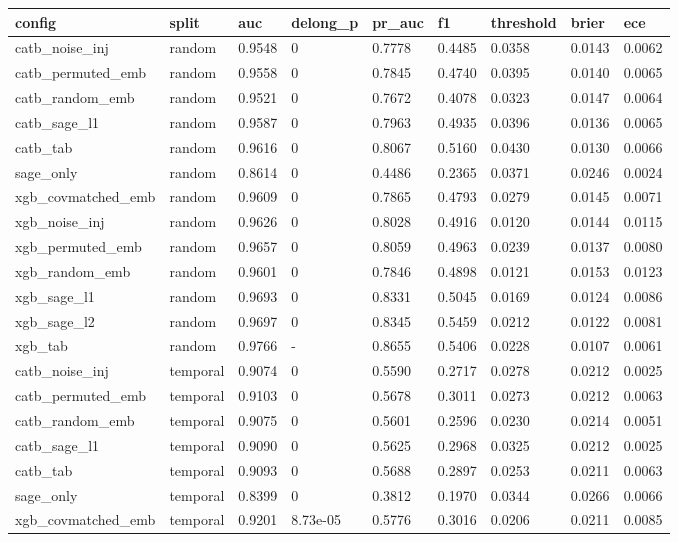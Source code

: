\begin{tabular}{lllllllll}
\toprule
config & split & auc & delong\_p & pr\_auc & f1 & threshold & brier & ece \\
\midrule
catb\_noise\_inj & random & 0.9548 & 0 & 0.7778 & 0.4485 & 0.0358 & 0.0143 & 0.0062 \\
catb\_permuted\_emb & random & 0.9558 & 0 & 0.7845 & 0.4740 & 0.0395 & 0.0140 & 0.0065 \\
catb\_random\_emb & random & 0.9521 & 0 & 0.7672 & 0.4078 & 0.0323 & 0.0147 & 0.0064 \\
catb\_sage\_l1 & random & 0.9587 & 0 & 0.7963 & 0.4935 & 0.0396 & 0.0136 & 0.0065 \\
catb\_tab & random & 0.9616 & 0 & 0.8067 & 0.5160 & 0.0430 & 0.0130 & 0.0066 \\
sage\_only & random & 0.8614 & 0 & 0.4486 & 0.2365 & 0.0371 & 0.0246 & 0.0024 \\
xgb\_covmatched\_emb & random & 0.9609 & 0 & 0.7865 & 0.4793 & 0.0279 & 0.0145 & 0.0071 \\
xgb\_noise\_inj & random & 0.9626 & 0 & 0.8028 & 0.4916 & 0.0120 & 0.0144 & 0.0115 \\
xgb\_permuted\_emb & random & 0.9657 & 0 & 0.8059 & 0.4963 & 0.0239 & 0.0137 & 0.0080 \\
xgb\_random\_emb & random & 0.9601 & 0 & 0.7846 & 0.4898 & 0.0121 & 0.0153 & 0.0123 \\
xgb\_sage\_l1 & random & 0.9693 & 0 & 0.8331 & 0.5045 & 0.0169 & 0.0124 & 0.0086 \\
xgb\_sage\_l2 & random & 0.9697 & 0 & 0.8345 & 0.5459 & 0.0212 & 0.0122 & 0.0081 \\
xgb\_tab & random & 0.9766 & - & 0.8655 & 0.5406 & 0.0228 & 0.0107 & 0.0061 \\
catb\_noise\_inj & temporal & 0.9074 & 0 & 0.5590 & 0.2717 & 0.0278 & 0.0212 & 0.0025 \\
catb\_permuted\_emb & temporal & 0.9103 & 0 & 0.5678 & 0.3011 & 0.0273 & 0.0212 & 0.0063 \\
catb\_random\_emb & temporal & 0.9075 & 0 & 0.5601 & 0.2596 & 0.0230 & 0.0214 & 0.0051 \\
catb\_sage\_l1 & temporal & 0.9090 & 0 & 0.5625 & 0.2968 & 0.0325 & 0.0212 & 0.0025 \\
catb\_tab & temporal & 0.9093 & 0 & 0.5688 & 0.2897 & 0.0253 & 0.0211 & 0.0063 \\
sage\_only & temporal & 0.8399 & 0 & 0.3812 & 0.1970 & 0.0344 & 0.0266 & 0.0066 \\
xgb\_covmatched\_emb & temporal & 0.9201 & 8.73e-05 & 0.5776 & 0.3016 & 0.0206 & 0.0211 & 0.0085 \\

\end{tabular}
